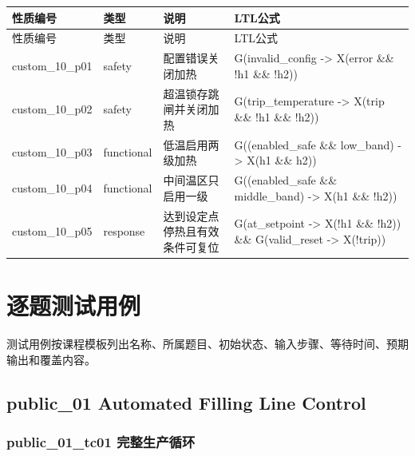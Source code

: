 \begin{longtable}{L{2.3cm}L{1.7cm}L{4.1cm}L{5.2cm}}

\toprule

性质编号 & 类型 & 说明 & LTL公式\\

\midrule

\endfirsthead

\toprule

性质编号 & 类型 & 说明 & LTL公式\\

\midrule

\endhead

{\ttfamily custom\_10\_p01} & safety & 配置错误关闭加热 & {\ttfamily G(invalid\_config -> X(error \&\& !h1 \&\& !h2))}\\

{\ttfamily custom\_10\_p02} & safety & 超温锁存跳闸并关闭加热 & {\ttfamily G(trip\_temperature -> X(trip \&\& !h1 \&\& !h2))}\\

{\ttfamily custom\_10\_p03} & functional & 低温启用两级加热 & {\ttfamily G((enabled\_safe \&\& low\_band) -> X(h1 \&\& h2))}\\

{\ttfamily custom\_10\_p04} & functional & 中间温区只启用一级 & {\ttfamily G((enabled\_safe \&\& middle\_band) -> X(h1 \&\& !h2))}\\

{\ttfamily custom\_10\_p05} & response & 达到设定点停热且有效条件可复位 & {\ttfamily G(at\_setpoint -> X(!h1 \&\& !h2)) \&\& G(valid\_reset -> X(!trip))}\\

\bottomrule

\end{longtable}

\section{逐题测试用例}

测试用例按课程模板列出名称、所属题目、初始状态、输入步骤、等待时间、预期输出和覆盖内容。

\subsection{{\ttfamily public\_01} Automated Filling Line Control}

\subsubsection{{\ttfamily public\_01\_tc01} 完整生产循环}

